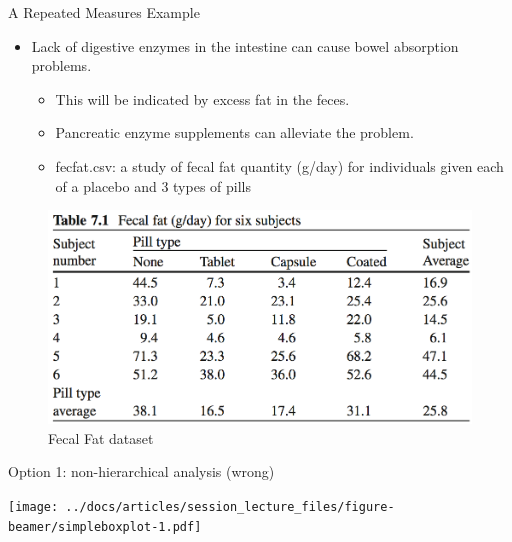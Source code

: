 \documentclass[
  ignorenonframetext,
]{beamer}
\providecommand{\tightlist}{%
  \setlength{\itemsep}{0pt}\setlength{\parskip}{0pt}}
\begin{document}
\begin{frame}{A Repeated Measures Example}
\protect\hypertarget{a-repeated-measures-example}{}

\begin{itemize}
\tightlist
\item
  Lack of digestive enzymes in the intestine can cause bowel absorption
  problems.

  \begin{itemize}
  \tightlist
  \item
    This will be indicated by excess fat in the feces.
  \item
    Pancreatic enzyme supplements can alleviate the problem.
  \item
    fecfat.csv: a study of fecal fat quantity (g/day) for individuals
    given each of a placebo and 3 types of pills
  \end{itemize}
\end{itemize}

\begin{figure}
\centering
\includegraphics{VittinghoffTable71.png}
\caption{Fecal Fat dataset}
\end{figure}

\end{frame}

\begin{frame}{Option 1: non-hierarchical analysis (wrong)}
\protect\hypertarget{option-1-non-hierarchical-analysis-wrong}{}

\texttt{[image: ../docs/articles/session\_lecture\_files/figure-beamer/simpleboxplot-1.pdf]}

\end{frame}
\end{document}
